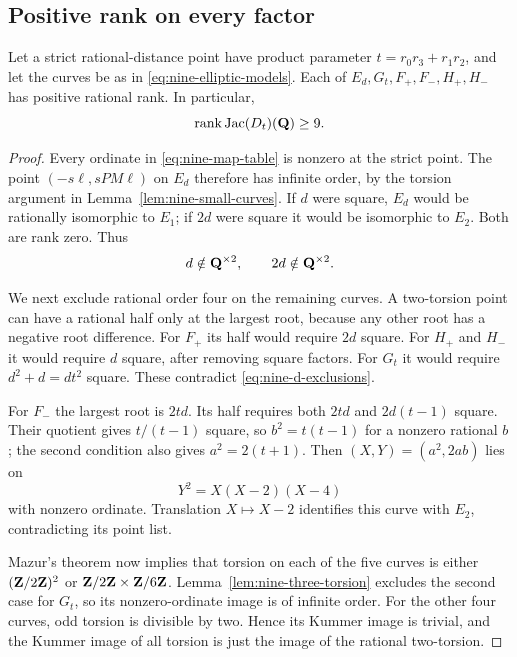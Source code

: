 \subsection{Positive rank on every factor}

\begin{theorem}\label{thm:nine-positive-ranks}
Let a strict rational-distance point have product parameter
$t=r_0r_3+r_1r_2$, and let the curves be as in
\eqref{eq:nine-elliptic-models}.  Each of
$E_d,G_t,F_+,F_-,H_+,H_-$ has positive rational rank.  In particular,
\begin{equation}\label{eq:nine-rank-nine}
 \operatorname{rank}\operatorname{Jac}(D_t)(\mathbf Q)\ge9.
\end{equation}
\end{theorem}
\begin{proof}
Every ordinate in \eqref{eq:nine-map-table} is nonzero at the strict
point.  The point $(-s\ell,sPM\ell)$ on $E_d$ therefore has infinite
order, by the torsion argument in
Lemma~\ref{lem:nine-small-curves}.  If $d$ were square, $E_d$ would
be rationally isomorphic to $E_1$; if $2d$ were square it would be
isomorphic to $E_2$.  Both are rank zero.  Thus
\begin{equation}\label{eq:nine-d-exclusions}
 d\notin\mathbf Q^{\times2},\qquad 2d\notin\mathbf Q^{\times2}.
\end{equation}

We next exclude rational order four on the remaining curves.
A two-torsion point can have a rational half only at the largest
root, because any other root has a negative root difference.
For $F_+$ its half would require $2d$ square.  For $H_+$ and $H_-$
it would require $d$ square, after removing square factors.
For $G_t$ it would require $d^2+d=dt^2$ square.  These contradict
\eqref{eq:nine-d-exclusions}.

For $F_-$ the largest root is $2td$.  Its half requires both
$2td$ and $2d(t-1)$ square.  Their quotient gives
$t/(t-1)$ square, so $b^2=t(t-1)$ for a nonzero rational $b$;
the second condition also gives $a^2=2(t+1)$.
Then $(X,Y)=(a^2,2ab)$ lies on
\[
 Y^2=X(X-2)(X-4)
\]
with nonzero ordinate.  Translation $X\mapsto X-2$ identifies this
curve with $E_2$, contradicting its point list.

Mazur's theorem now implies that torsion on each of the five curves
is either $(\mathbf Z/2\mathbf Z)^2$ or $\mathbf Z/2\mathbf Z\times\mathbf Z/6\mathbf Z$.
Lemma~\ref{lem:nine-three-torsion} excludes the second case for $G_t$,
so its nonzero-ordinate image is of infinite order.
For the other four curves, odd torsion is divisible by two.  Hence its
Kummer image is trivial, and the Kummer image of all torsion is just
the image of the rational two-torsion.


\end{proof}
